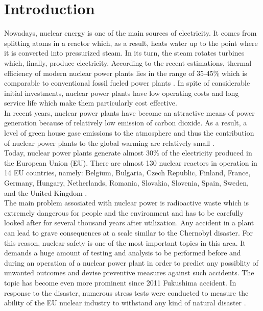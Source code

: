 \chapter{Introduction}\label{chapter:introduction}

Nowadays, nuclear energy is one of the main sources of electricity. It comes from splitting atoms in a reactor which, as a result, heats water up to the point where it is converted into pressurized steam. In its turn, the steam rotates turbines which, finally, produce electricity. According to the recent estimations, thermal efficiency of modern nuclear power plants lies in the range of 35-45\% which is comparable to conventional fossil fueled power plants \cite{intro:efficiency-of-nuclear-power-plants}. In spite of considerable initial investments,  nuclear power plants have low operating costs and long service life which make them particularly cost effective.\\


In recent years, nuclear power plants have become an attractive means of power generation because of relatively low emission of carbon dioxide. As a result, a level of green house gase emissions to the atmosphere and thus the contribution of nuclear power plants to the global warming are relatively small \cite{intro:pros-and-cons-of-nuclear-power}.\\


Today, nuclear power plants generate almost 30\% of the electricity produced in the European Union (EU). There are almost 130 nuclear reactors in operation in 14 EU countries, namely: Belgium, Bulgaria, Czech Republic, Finland, France, Germany, Hungary, Netherlands, Romania, Slovakia, Slovenia, Spain, Sweden, and the United Kingdom \cite{intro:eu-nuclear-industry-general}.\\


The main problem assosiated with nuclear power is radioactive waste which is extremely dangerous for people and the environment and has to be carefully looked after for several thousand years after utilization. Any accident in a plant can lead to grave consequences at a scale similar to the Chernobyl disaster. For this reason, nuclear safety is one of the most important topics in this area. It demands a huge amount of testing and analysis to be performed before and during an operation of a nuclear power plant in order to predict any possiblity of unwanted outcomes and devise preventive measures against such accidents. The topic has become even more prominent since 2011 Fukushima accident. In response to the disaster, numerous stress tests were conducted to measure the ability of the EU nuclear industry to withstand any kind of natural disaster \cite{intro:eu-nuclear-industry-general}.\\



